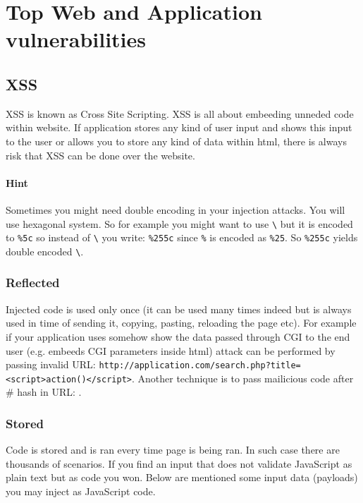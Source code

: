 \documentclass{article}[12pt]
\newcommand{\q}[1]{\texttt{#1}}
\begin{document}





\section{Top Web and Application vulnerabilities}




\subsection{XSS} XSS is known as Cross Site Scripting.
XSS is all about embeeding unneded code within website.
If application stores any kind of user input and shows this input to the user or allows you to store any kind of data within html, there is always risk that XSS can be done over the website.

\paragraph{Hint} Sometimes you might need double encoding in your injection attacks.
You will use hexagonal system.
So for example you might want to use \q{\textbackslash} but it is encoded to \q{\%5c} so instead of \q{\textbackslash} you write: \q{\%255c} since \q{\%} is encoded as \q{\%25}.
So \q{\%255c} yields double encoded \q{\textbackslash}.
\subsubsection{Reflected} Injected code is used only once (it can be used many times indeed but is always used in time of sending it, copying, pasting, reloading the page etc).
For example if your application uses somehow show the data passed through CGI to the end user (e.g. embeeds CGI parameters inside html) attack can be performed by passing invalid URL: \texttt{http://application.com/search.php?title=<script>action()</script>}.
Another technique is to pass mailicious code after \# hash in URL: \texttt{}.
\subsubsection{Stored}  Code is stored and is ran every time page is being ran.
In such case there are thousands of scenarios.
If you find an input that does not validate JavaScript as plain text but as code you won.
Below are mentioned some input data (payloads) you may inject as JavaScript code.\newline
\end{document}
